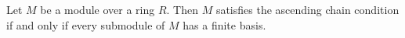 Let $M$ be a module over a ring $R$. Then $M$ satisfies the ascending chain condition if and only if every submodule of $M$ has a finite basis.
